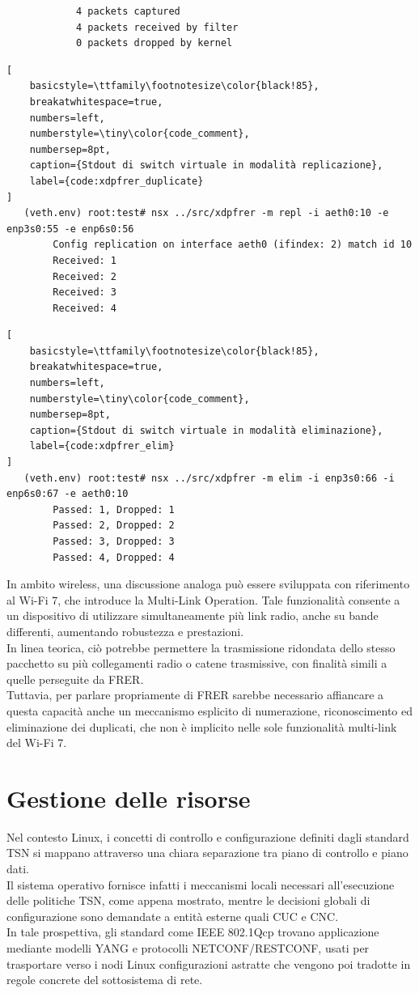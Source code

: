 \documentclass[12pt,a4paper,twoside]{book}
\begin{document}
\begin{onehalfspace}
\begin{lstlisting}
            4 packets captured
            4 packets received by filter
            0 packets dropped by kernel
\end{lstlisting}

\begin{lstlisting}[
    basicstyle=\ttfamily\footnotesize\color{black!85},
    breakatwhitespace=true,
    numbers=left,
    numberstyle=\tiny\color{code_comment},
    numbersep=8pt,
    caption={Stdout di switch virtuale in modalità replicazione},
    label={code:xdpfrer_duplicate}
]
   (veth.env) root:test# nsx ../src/xdpfrer -m repl -i aeth0:10 -e enp3s0:55 -e enp6s0:56
        Config replication on interface aeth0 (ifindex: 2) match id 10
        Received: 1
        Received: 2
        Received: 3
        Received: 4
\end{lstlisting}

\begin{lstlisting}[
    basicstyle=\ttfamily\footnotesize\color{black!85},
    breakatwhitespace=true,
    numbers=left,
    numberstyle=\tiny\color{code_comment},
    numbersep=8pt,
    caption={Stdout di switch virtuale in modalità eliminazione},
    label={code:xdpfrer_elim}
]
   (veth.env) root:test# nsx ../src/xdpfrer -m elim -i enp3s0:66 -i enp6s0:67 -e aeth0:10
        Passed: 1, Dropped: 1
        Passed: 2, Dropped: 2
        Passed: 3, Dropped: 3
        Passed: 4, Dropped: 4

\end{lstlisting}
In ambito wireless, una discussione analoga può essere sviluppata con riferimento al Wi-Fi 7, che introduce la Multi-Link Operation. Tale funzionalità consente a un dispositivo di utilizzare simultaneamente più link radio, anche su bande differenti, aumentando robustezza e prestazioni. 
\\
In linea teorica, ciò potrebbe permettere la trasmissione ridondata dello stesso pacchetto su più collegamenti radio o catene trasmissive, con finalità simili a quelle perseguite da FRER. 
\\
Tuttavia, per parlare propriamente di FRER sarebbe necessario affiancare a questa capacità anche un meccanismo esplicito di numerazione, riconoscimento ed eliminazione dei duplicati, che non è implicito nelle sole funzionalità multi-link del Wi-Fi 7.
\section{Gestione delle risorse}
Nel contesto Linux, i concetti di controllo e configurazione definiti dagli standard TSN si mappano attraverso una chiara separazione tra piano di controllo e piano dati. 
\\
Il sistema operativo fornisce infatti i meccanismi locali necessari all'esecuzione delle politiche TSN, come appena mostrato, mentre le decisioni globali di configurazione sono demandate a entità esterne quali CUC e CNC. 
\\
In tale prospettiva, gli standard come IEEE 802.1Qcp trovano applicazione mediante modelli YANG e protocolli NETCONF/RESTCONF, usati per trasportare verso i nodi Linux configurazioni astratte che vengono poi tradotte in regole concrete del sottosistema di rete. 

\end{onehalfspace}
\end{document}
